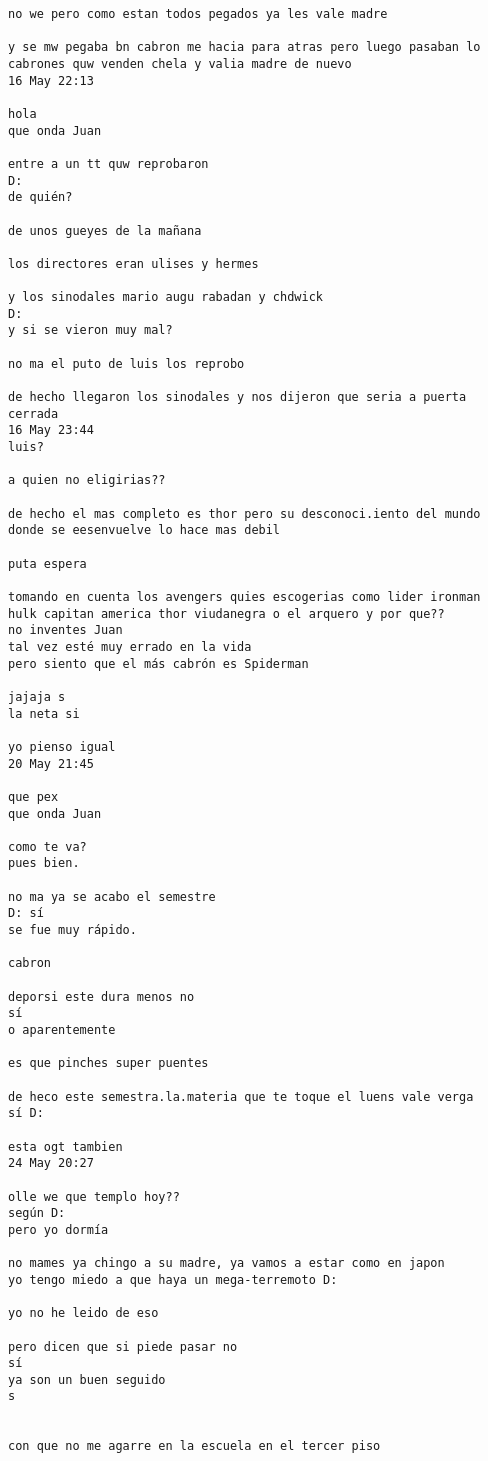 \begin{verbatim}
no we pero como estan todos pegados ya les vale madre

y se mw pegaba bn cabron me hacia para atras pero luego pasaban lo cabrones quw venden chela y valia madre de nuevo
16 May 22:13

hola
que onda Juan

entre a un tt quw reprobaron
D:
de quién?

de unos gueyes de la mañana

los directores eran ulises y hermes

y los sinodales mario augu rabadan y chdwick
D:
y si se vieron muy mal?

no ma el puto de luis los reprobo

de hecho llegaron los sinodales y nos dijeron que seria a puerta cerrada
16 May 23:44
luis?

a quien no eligirias??

de hecho el mas completo es thor pero su desconoci.iento del mundo donde se eesenvuelve lo hace mas debil

puta espera

tomando en cuenta los avengers quies escogerias como lider ironman hulk capitan america thor viudanegra o el arquero y por que??
no inventes Juan
tal vez esté muy errado en la vida
pero siento que el más cabrón es Spiderman

jajaja s
la neta si

yo pienso igual
20 May 21:45

que pex
que onda Juan

como te va?
pues bien.

no ma ya se acabo el semestre
D: sí
se fue muy rápido.

cabron

deporsi este dura menos no
sí
o aparentemente

es que pinches super puentes

de heco este semestra.la.materia que te toque el luens vale verga
sí D:

esta ogt tambien
24 May 20:27

olle we que templo hoy??
según D:
pero yo dormía

no mames ya chingo a su madre, ya vamos a estar como en japon
yo tengo miedo a que haya un mega-terremoto D:

yo no he leido de eso

pero dicen que si piede pasar no
sí
ya son un buen seguido
s


con que no me agarre en la escuela en el tercer piso


\end{verbatim}
